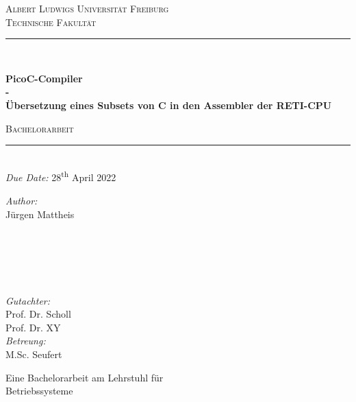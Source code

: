 \begin{titlepage}
  \vspace{1cm}
  \center
  \textsc{\LARGE Albert Ludwigs Universität Freiburg}\\[0.5cm]
  \textsc{\Large Technische Fakultät}\\[2.0cm]

  \rule{\linewidth}{0.5mm}\\[0.4cm]
    {\huge \bfseries PicoC-Compiler\\\LARGE - \\ Übersetzung eines Subsets von C in den Assembler der RETI-CPU\par}
    \vspace{0.5cm}
    \textsc{\large Bachelorarbeit}\\
    \rule{\linewidth}{0.5mm}\\[0.5cm]

  {\large \emph{Due Date:} 28\textsuperscript{th} April 2022}\\[2.5cm]

  \begin{minipage}{0.45\textwidth}
    \begin{flushleft} \large
      \emph{Author:}\\
      Jürgen Mattheis\\
      \hspace{1cm}\\
      \hspace{1cm}\\
      \hspace{1cm}\\
      \hspace{1cm}
    \end{flushleft}
  \end{minipage}
  ~
  \begin{minipage}{0.45\textwidth}
    \begin{flushright} \large
      \emph{Gutachter:}\\
      Prof. Dr. Scholl\\
      Prof. Dr. XY\\[0.64cm]
      \emph{Betreung:}\\
      M.Sc. Seufert\\
    \end{flushright}
  \end{minipage}

  \vspace{9.5cm}
  \large{Eine Bachelorarbeit am Lehrstuhl für}\\
  \large{Betriebssysteme}
\end{titlepage}
